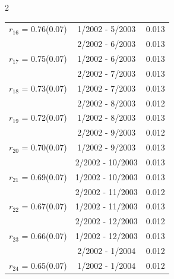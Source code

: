\begin{multicols}{2}
{\begin{tabular}{ccc}
  $r_{16}$ = 0.76(0.07) &       1/2002 -  5/2003 &        0.013   \vspace{-.10in} \\  
&        2/2002 -  6/2003 &        0.013  \vspace{-.02in} \\ \hline 
  $r_{17}$ = 0.75(0.07) &       1/2002 -  6/2003 &        0.013   \vspace{-.10in} \\  
&        2/2002 -  7/2003 &        0.013  \vspace{-.02in} \\ \hline 
  $r_{18}$ = 0.73(0.07) &       1/2002 -  7/2003 &        0.013   \vspace{-.10in} \\  
&        2/2002 -  8/2003 &        0.012  \vspace{-.02in} \\ \hline 
  $r_{19}$ = 0.72(0.07) &       1/2002 -  8/2003 &        0.013   \vspace{-.10in} \\  
&        2/2002 -  9/2003 &        0.012  \vspace{-.02in} \\ \hline 
  $r_{20}$ = 0.70(0.07) &       1/2002 -  9/2003 &        0.013   \vspace{-.10in} \\  
&        2/2002 - 10/2003 &        0.013  \vspace{-.02in} \\ \hline 
  $r_{21}$ = 0.69(0.07) &       1/2002 - 10/2003 &        0.013   \vspace{-.10in} \\  
&        2/2002 - 11/2003 &        0.012  \vspace{-.02in} \\ \hline 
  $r_{22}$ = 0.67(0.07) &       1/2002 - 11/2003 &        0.013   \vspace{-.10in} \\  
&        2/2002 - 12/2003 &        0.012  \vspace{-.02in} \\ \hline 
  $r_{23}$ = 0.66(0.07) &       1/2002 - 12/2003 &        0.013   \vspace{-.10in} \\  
&        2/2002 -  1/2004 &        0.012  \vspace{-.02in} \\ \hline 
  $r_{24}$ = 0.65(0.07) &       1/2002 -  1/2004 &        0.012   \vspace{-.10in} \\  

\end{tabular}}
\end{multicols}
